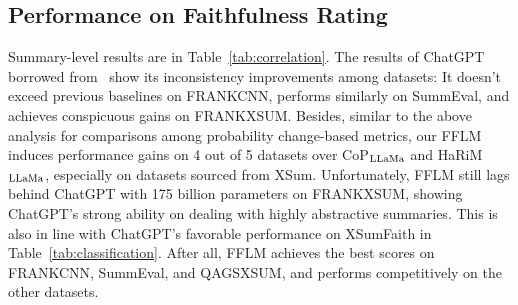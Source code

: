 \subsection{Performance on Faithfulness Rating}
\label{sec:results-fr}




Summary-level results are in Table~\ref{tab:correlation}. 
The results of ChatGPT borrowed from~\citet{luo2023chatgpt} show its inconsistency improvements among datasets: It doesn't exceed previous baselines on FRANKCNN, performs similarly on SummEval, and achieves conspicuous gains on FRANKXSUM.
Besides, similar to the above analysis for comparisons among probability change-based metrics, our FFLM induces performance gains on 4 out of 5 datasets over CoP$_{\rm LLaMa}$ and HaRiM$_{\rm LLaMa}$, especially on datasets sourced from XSum. 
Unfortunately, FFLM still lags behind ChatGPT with 175 billion parameters on FRANKXSUM, showing ChatGPT's strong ability on dealing with highly abstractive summaries. This is also in line with ChatGPT's favorable performance on XSumFaith in Table~\ref{tab:classification}. 
After all, FFLM achieves the best scores on FRANKCNN, SummEval, and QAGSXSUM, and performs competitively on the other datasets.





